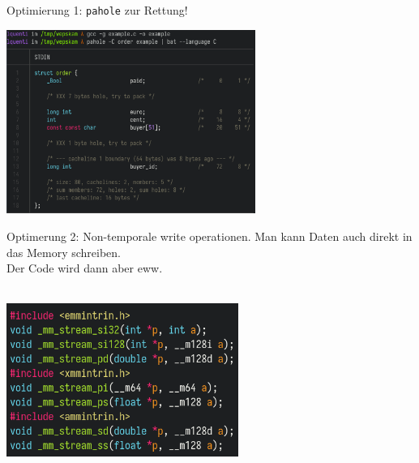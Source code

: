 \documentclass{beamer}
\begin{document}
%
%
\begin{frame}{Optimierung 1: \texttt{pahole} zur Rettung!}
\centerline{\includegraphics[height=6cm]{example5.png}}
\end{frame}

\begin{frame}{Optimerung 2: Non-temporale write operationen.}
Man kann Daten auch direkt in das Memory schreiben.\\

Der Code wird dann aber eww.\\~\\
\centerline{\includegraphics[height=5cm]{nontemporal.png}}
\end{frame}
\end{document}
